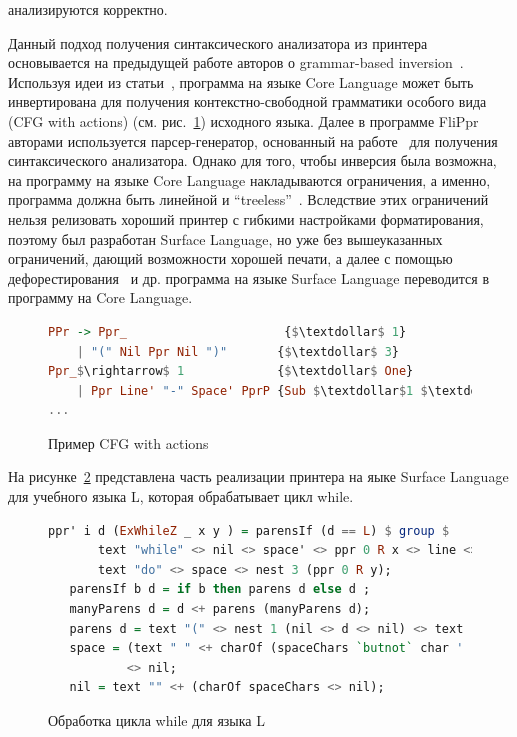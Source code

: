 \noindent анализируются корректно.

Данный подход получения синтаксического анализатора из принтера основывается на предыдущей 
работе авторов о grammar-based inversion~\cite{MatsudaPrew}. Используя идеи из статьи~\cite{MatsudaPrew}, 
программа на языке Core Language может быть инвертирована для получения контекстно-свободной 
грамматики особого вида (CFG with actions) (см. рис.~\ref{CFGAct}) исходного языка. 
Далее в программе FliPpr авторами используется парсер-генератор, основанный на работе~\cite{Frost} 
для получения синтаксического анализатора. Однако для того, чтобы инверсия была возможна, 
на программу на языке Core Language накладываются ограничения, а именно, программа должна 
быть линейной и ``treeless''~\cite{WadlerDeforest}. Вследствие этих ограничений нельзя 
релизовать хороший принтер с гибкими настройками форматирования, поэтому был разработан 
Surface Language, но уже без вышеуказанных ограничений, дающий возможности хорошей 
печати, а далее с помощью дефорестирования~\cite{WadlerDeforest} и др. программа на языке 
Surface Language переводится в программу на Core Language.

\begin{figure}[h]
\centering
\begin{lstlisting}[language=Haskell,mathescape]
PPr -> Ppr_                      {$\textdollar$ 1}
    | "(" Nil Ppr Nil ")"       {$\textdollar$ 3} 
Ppr_$\rightarrow$ 1             {$\textdollar$ One}
    | Ppr Line' "-" Space' PprP {Sub $\textdollar$1 $\textdollar$5 }
...    
\end{lstlisting}
\caption{Пример CFG with actions}
\label{CFGAct}
\end{figure}

На рисунке~\ref{LFliPpr} представлена часть реализации принтера на яыке Surface Language для учебного 
языка L, которая обрабатывает цикл while.

\begin{figure}[ht]
\centering
\begin{lstlisting}[language=Haskell]
   ppr' i d (ExWhileZ _ x y ) = parensIf (d == L) $ group $ 
       text "while" <> nil <> space' <> ppr 0 R x <> line <> 
       text "do" <> space <> nest 3 (ppr 0 R y);                                                
   parensIf b d = if b then parens d else d ;
   manyParens d = d <+ parens (manyParens d);
   parens d = text "(" <> nest 1 (nil <> d <> nil) <> text ")";
   space = (text " " <+ charOf (spaceChars `butnot` char ' ')) 
           <> nil;
   nil = text "" <+ (charOf spaceChars <> nil);
\end{lstlisting}
\caption{Обработка цикла while для языка L}
\label{LFliPpr}
\end{figure}


